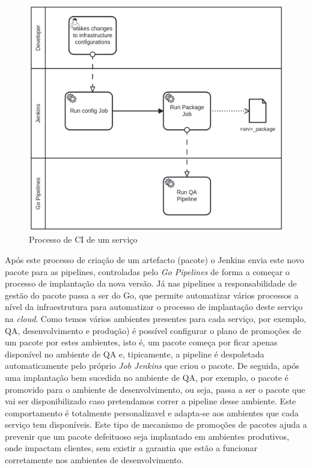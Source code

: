 \begin{figure}[H]
  \centerline{\includegraphics[scale=0.2]{media/content/impl/ci-process.png}}
  \caption{Processo de \ac{CI} de um serviço}
  \label{ci-process}
\end{figure}

Após este processo de criação de um artefacto (pacote) o Jenkins envia este novo pacote para as
\glspl{pipeline}, controladas pelo \textit{Go Pipelines} de forma a começar o processo de 
implantação da nova versão. Já nas \glspl{pipeline} a responsabilidade de gestão do pacote passa a 
ser do Go, que permite automatizar vários processos a nível da infraestrutura para automatizar o 
processo de implantação deste serviço na \textit{cloud}. Como temos vários ambientes presentes para 
cada serviço, por exemplo, \ac{QA}, desenvolvimento e produção) é possível configurar o plano de 
promoções de um pacote por estes ambientes, isto é, um pacote começa por ficar apenas disponível no 
ambiente de QA e, tipicamente, a \gls{pipeline} é despoletada automaticamente pelo próprio 
\textit{Job Jenkins} que criou o pacote. De seguida, após uma implantação bem sucedida no ambiente 
de QA, por exemplo, o pacote é promovido para o ambiente de desenvolvimento, ou seja, passa a ser 
o pacote que vai ser disponibilizado caso pretendamos correr a \gls{pipeline} desse ambiente. 
Este comportamento é totalmente personalizavel e adapta-se aos ambientes que cada serviço tem 
disponíveis. Este tipo de mecanismo de promoções de pacotes ajuda a prevenir que um pacote 
defeituoso seja implantado em ambientes produtivos, onde impactam clientes, sem existir a garantia 
que estão a funcionar corretamente nos ambientes de desenvolvimento.

